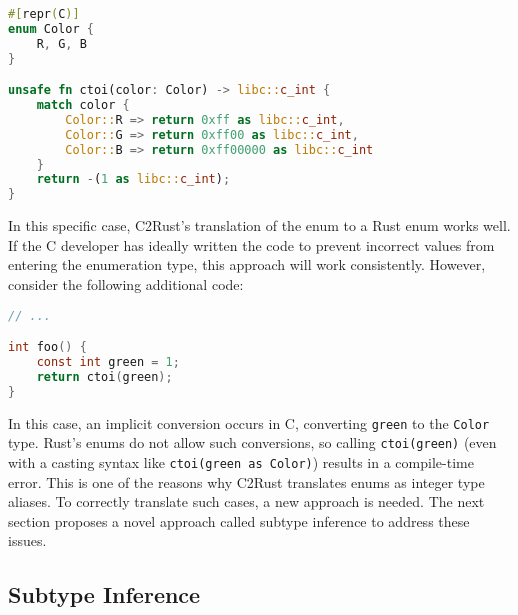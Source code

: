 \documentclass[10pt,conference]{IEEEtran}
\begin{document}
\begin{lstlisting}[language=Rust]
#[repr(C)]
enum Color {
    R, G, B
}

unsafe fn ctoi(color: Color) -> libc::c_int {
    match color {
        Color::R => return 0xff as libc::c_int,
        Color::G => return 0xff00 as libc::c_int,
        Color::B => return 0xff00000 as libc::c_int
    }
    return -(1 as libc::c_int);
}
\end{lstlisting}


In this specific case, C2Rust's translation of the enum to a Rust enum works well. If the C developer has ideally written the code to prevent incorrect values from entering the enumeration type, this approach will work consistently. However, consider the following additional code:

\begin{lstlisting}[language=C, label=lst:example]
// ...

int foo() {
    const int green = 1;
    return ctoi(green);
}
\end{lstlisting}


In this case, an implicit conversion occurs in C, converting \texttt{green} to the \texttt{Color} type. Rust's enums do not allow such conversions, so calling \texttt{ctoi(green)} (even with a casting syntax like \texttt{ctoi(green as Color)}) results in a compile-time error. This is one of the reasons why C2Rust translates enums as integer type aliases. To correctly translate such cases, a new approach is needed. The next section proposes a novel approach called subtype inference to address these issues.

\subsection{Subtype Inference}
\end{document}
